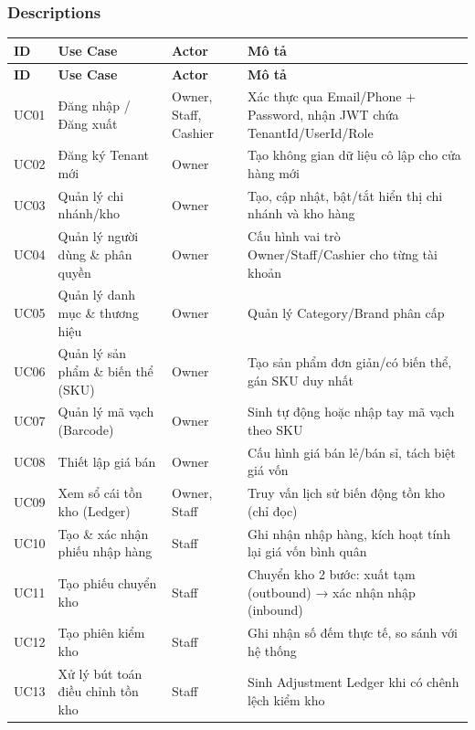 \subsubsection{Descriptions}

\begin{longtable}{|p{1.2cm}|p{4.2cm}|p{3.3cm}|p{8.9cm}|}
    \hline
    \textbf{ID} & \textbf{Use Case} & \textbf{Actor} & \textbf{Mô tả} \\
    \hline
    \endfirsthead
    \hline
    \textbf{ID} & \textbf{Use Case} & \textbf{Actor} & \textbf{Mô tả} \\
    \hline
    \endhead
    UC01 & Đăng nhập / Đăng xuất & Owner, Staff, Cashier & Xác thực qua Email/Phone + Password, nhận JWT chứa TenantId/UserId/Role \\
    \hline
    UC02 & Đăng ký Tenant mới & Owner & Tạo không gian dữ liệu cô lập cho cửa hàng mới \\
    \hline
    UC03 & Quản lý chi nhánh/kho & Owner & Tạo, cập nhật, bật/tắt hiển thị chi nhánh và kho hàng \\
    \hline
    UC04 & Quản lý người dùng \& phân quyền & Owner & Cấu hình vai trò Owner/Staff/Cashier cho từng tài khoản \\
    \hline
    UC05 & Quản lý danh mục \& thương hiệu & Owner & Quản lý Category/Brand phân cấp \\
    \hline
    UC06 & Quản lý sản phẩm \& biến thể (SKU) & Owner & Tạo sản phẩm đơn giản/có biến thể, gán SKU duy nhất \\
    \hline
    UC07 & Quản lý mã vạch (Barcode) & Owner & Sinh tự động hoặc nhập tay mã vạch theo SKU \\
    \hline
    UC08 & Thiết lập giá bán & Owner & Cấu hình giá bán lẻ/bán sỉ, tách biệt giá vốn \\
    \hline
    UC09 & Xem sổ cái tồn kho (Ledger) & Owner, Staff & Truy vấn lịch sử biến động tồn kho (chỉ đọc) \\
    \hline
    UC10 & Tạo \& xác nhận phiếu nhập hàng & Staff & Ghi nhận nhập hàng, kích hoạt tính lại giá vốn bình quân \\
    \hline
    UC11 & Tạo phiếu chuyển kho & Staff & Chuyển kho 2 bước: xuất tạm (outbound) → xác nhận nhập (inbound) \\
    \hline
    UC12 & Tạo phiên kiểm kho & Staff & Ghi nhận số đếm thực tế, so sánh với hệ thống \\
    \hline
    UC13 & Xử lý bút toán điều chỉnh tồn kho & Staff & Sinh Adjustment Ledger khi có chênh lệch kiểm kho \\

\end{longtable}
